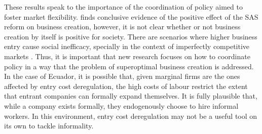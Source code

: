 \documentclass[11pt,a4paper]{article}\usepackage[]{graphicx}\usepackage[]{xcolor}
\begin{document}
These results speak to the importance of the coordination of policy aimed to foster market flexibility. \textcite{CaminoMogro.2022} finds conclusive evidence of the positive effect of the SAS reform on business creation, however, it is not clear whether or not business creation by itself is positive for society. There are scenarios where higher business entry cause social inefficacy, specially in the context of imperfectly competitive markets \parencite{Mankiw.1986}. Thus, it is important that new research focuses on how to coordinate policy in a way that the problem of superoptimal business creation is addressed. In the case of Ecuador, it is possible that, given marginal firms are the ones affected by entry cost deregulation, the high costs of labour restrict the extent that entrant companies can formally expand themselves. It is fully plausible that, while a company exists formally, they endogenously choose to hire informal workers. In this environment, entry cost deregulation may not be a useful tool on its own to tackle informality. 
\printbibliography
\clearpage
\end{document}
